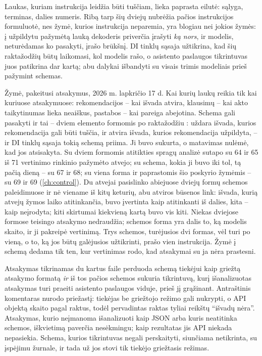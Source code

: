 Laukas, kuriam instrukcija leidžia būti tuščiam, lieka paprasta eilutė: sąlyga, terminas,
dalies numeris. Ribą tarp šių dviejų nubrėžia pačios instrukcijos formuluotė, nes žymė, kurios
instrukcija neparemia, yra blogiau nei jokios žymės: į užpildytu pažymėtą lauką dekoderis
priverčia įrašyti \emph{ką nors}, ir modelis, neturėdamas ko pasakyti, įrašo brūkšnį. DI tinklų
sąsaja užtikrina, kad šių raktažodžių būtų laikomasi, kol modelis rašo, o asistento paslaugos
tikrintuvas juos patikrina dar kartą; abu dalykai išbandyti su visais trimis modeliais prieš
pažymint schemas.

\begin{lessonbox}{Žymė, pakeitusi atsakymus, 2026 m. lapkričio 17 d.}
Kai kurių laukų reikia tik kai kuriuose atsakymuose: rekomendacijos -- kai išvada atvira,
klausimų -- kai akto taikytinumas lieka neaiškus, pastabos -- kai pareiga abejotina. Schema gali
pasakyti ir tai -- dviem elemento formomis po raktažodžiu : uždara išvada, kurios
rekomendacija gali būti tuščia, ir atvira išvada, kurios rekomendacija užpildyta, -- ir DI
tinklų sąsaja tokią schemą priima. Ji buvo sukurta, o matavimas nulėmė, kad jos atsisakyta.
Su dviem formomis atitikties spragų analizė sutapo su 64 ir 65 iš 71 vertinimo
rinkinio pažymėto atvejo; su schema, kokia ji buvo iki tol, tą pačią dieną -- su 67 ir 68; su
viena forma ir paprastomis šio poskyrio žymėmis -- su 69 ir 69 (\cref{ch:control}). Du atvejai
pasislinko abiejuose dviejų formų schemos paleidimuose ir nė viename iš kitų keturių, abu
atviros būsenos link: išvada, kurią atvejų žymos laiko atitinkančia, buvo įvertinta kaip
atitinkanti iš dalies, kita -- kaip neįrodyta; kiti skirtumai kiekvieną kartą buvo vis kiti. Niekas dviejose formose teisingo atsakymo nedraudžia; schemos forma yra
dalis to, ką modelis skaito, ir ji pakreipė vertinimą. Trys schemos, turėjusios dvi formas, vėl
turi po vieną, o to, ką jos būtų galėjusios užtikrinti, prašo vien instrukcija. Žymė į schemą
dedama tik ten, kur vertinimas rodo, kad atsakymai su ja nėra prastesni.
\end{lessonbox}

\begin{codebox}{Atsakymas tikrinamas du kartus}
 faile  perduoda schemą tiekėjui kaip griežtą
atsakymo formatą \emph{ir} iš tos pačios schemos sukuria tikrintuvą, kurį išanalizuotas
atsakymas turi praeiti asistento paslaugos viduje, prieš jį grąžinant. Antraštinis
komentaras nurodo priežastį: tiekėjas be griežtojo režimo gali nukrypti, o API objektą skaito
pagal raktus, todėl pervadintas raktas tyliai reikštų \enquote{išvadų nėra}. Atsakymas,
kurio neįmanoma išanalizuoti kaip JSON arba kuris neatitinka schemos, iškvietimą paverčia
nesėkmingu; kaip rezultatas jis API niekada nepasiekia. Schema, kurios tikrintuvas negali
perskaityti, siunčiama netikrinta, su įspėjimu žurnale, ir tada už jos stovi tik tiekėjo
griežtasis režimas.
\end{codebox}

